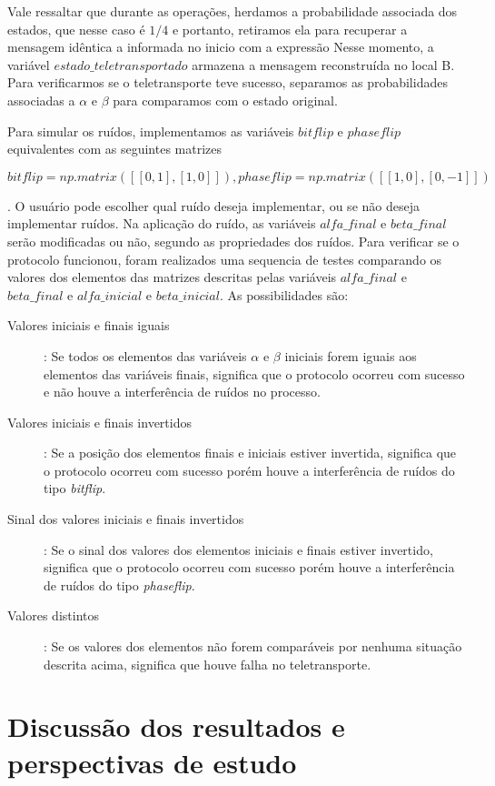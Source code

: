 Vale ressaltar que durante as operações, herdamos a probabilidade associada dos estados, que nesse caso é $1/4$ e portanto, retiramos ela para recuperar a mensagem idêntica a informada no inicio com a expressão Nesse momento, a variável \textit{$estado\_teletransportado$} armazena a mensagem reconstruída no local B. Para verificarmos se o teletransporte teve sucesso, separamos as probabilidades associadas a $\alpha$ e $\beta$ para comparamos com o estado original.

Para simular os ruídos, implementamos as variáveis \textit{$bitflip$}	e \textit{$phaseflip$} equivalentes com as seguintes matrizes\begin{tiny}\textbf{$bitflip = np.matrix([[0, 1], [1, 0]]), phaseflip = np.matrix([[1, 0], [0, -1]])$}\end{tiny}. O usuário pode escolher qual ruído deseja implementar, ou se não deseja implementar ruídos.
Na aplicação do ruído, as variáveis $alfa\_final$ e $beta\_final$ serão modificadas ou não, segundo as propriedades dos ruídos. Para verificar se o protocolo funcionou, foram realizados uma sequencia de testes comparando os valores dos elementos das matrizes descritas pelas variáveis $alfa\_final$ e $beta\_final$ e $alfa\_inicial$ e $beta\_inicial$. As possibilidades são:
\begin{description}
\item [Valores iniciais e finais iguais]: Se todos os elementos das variáveis $\alpha$ e $\beta$ iniciais forem iguais aos elementos das variáveis finais, significa que o protocolo ocorreu com sucesso e não houve a interferência de ruídos no processo.
\item [Valores iniciais e finais invertidos]: Se a posição dos elementos finais e iniciais estiver invertida, significa que o protocolo ocorreu com sucesso porém houve a interferência de ruídos do tipo \textit{bitflip}.
\item [Sinal dos valores iniciais e finais invertidos]: Se o sinal dos valores dos elementos iniciais e finais estiver invertido, significa que o protocolo ocorreu com sucesso porém houve a interferência de ruídos do tipo \textit{phaseflip}.
\item [Valores distintos]: Se os valores dos elementos não forem comparáveis por nenhuma situação descrita acima, significa que houve falha no teletransporte.
\end{description}

\clearpage

\chapter{Discussão dos resultados e perspectivas de estudo}\label{sec:resultados}

